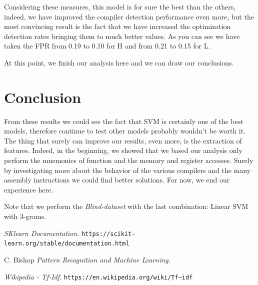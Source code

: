 \documentclass[12pt]{article}
\begin{document}
Considering these measures, this model is for sure the best than the others, indeed, we have improved the compiler detection performance even more, but the most convincing result is the fact that we have increased the optimization detection rates bringing them to much better values. As you can see we have taken the FPR from 0.19 to 0.10 for H and from 0.21 to 0.15 for L.

At this point, we finish our analysis here and we can draw our conclusions.

\section{Conclusion}
From these results we could see the fact that SVM is certainly one of the best models, therefore continue to test other models probably wouldn't be worth it. The thing that surely can improve our results, even more, is the extraction of features. Indeed, in the beginning, we showed that we based our analysis only perform the mnemonics of function and the memory and register accesses. Surely by investigating more about the behavior of the various compilers and the many assembly instructions we could find better solutions. For now, we end our experience here.

Note that we perform the {\em Blind-dataset} with the last combination: Linear SVM with 3-grams.

\vfill

\begin{thebibliography}{99}

{\em SKlearn Documentation}. 
 \verb|https://scikit-learn.org/stable/documentation.html|

C. Bishop
 {\em Pattern Recognition and Machine Learning}.

{\em Wikipedia - Tf-Idf}.
 \verb|https://en.wikipedia.org/wiki/Tf–idf|

\end{thebibliography}
\end{document}
